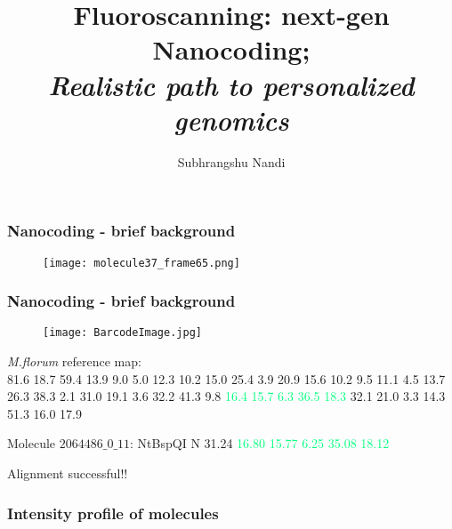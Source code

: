 \documentclass[10pt,dvipsnames,table]{beamer}
\title[Fluoroscanning: next generation nanocoding]{Fluoroscanning: next-gen Nanocoding; \\ {\emph{Realistic path to personalized genomics}}}
\author{Subhrangshu Nandi}
\begin{document}
\setlength{\baselineskip}{16truept}
\frame{\maketitle}



\begin{frame}
\frametitle{Nanocoding - brief background}
\begin{figure}[T]
\texttt{[image: molecule37\_frame65.png]}
\end{figure}
\end{frame}

\begin{frame}
\frametitle{Nanocoding - brief background}
\begin{figure}[T]
\texttt{[image: BarcodeImage.jpg]}
\end{figure}

{\emph{M.florum}} reference map: \\
81.6 18.7 59.4 13.9 9.0 5.0 12.3 10.2 15.0 25.4 3.9 20.9 15.6 10.2 9.5 11.1 4.5 
13.7 26.3 38.3 2.1 31.0 19.1 3.6 32.2 41.3 9.8 \textcolor<3>{SpringGreen}{16.4 15.7 6.3 36.5 18.3} 32.1 21.0 
3.3 14.3 51.3 16.0 17.9

\pause
Molecule $2064486\_0\_11$: NtBspQI N  31.24  \textcolor<3>{SpringGreen}{16.80  15.77  6.25  35.08  18.12}

Alignment successful!!
\end{frame}

\begin{frame}
\frametitle{Intensity profile of molecules}
\begin{center}
\end{center}
\end{frame}
\end{document}
